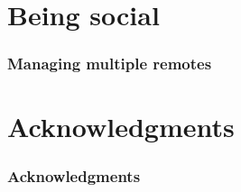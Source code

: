\documentclass[
14pt,
aspectratio=169,
usenames,
dvipsnames,
x11names]{beamer}
\begin{document}
\section{Being social}

\begin{frame}
  \frametitle{Managing multiple remotes}

\end{frame}

\section{Acknowledgments}

\begin{frame}
  \frametitle{Acknowledgments}

\end{frame}


\end{document}

